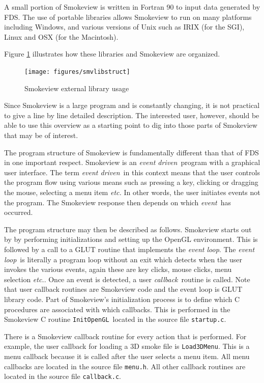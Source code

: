 \documentclass[11pt,twoside]{book}
\begin{document}
A small portion of Smokeview is written in Fortran 90 to input
data generated by FDS.  The use of portable libraries allows
Smokeview to run on many platforms including Windows, and various
versions of Unix such as IRIX (for the SGI), Linux and OSX (for
the Macintosh).

Figure \ref{smvlibstruct} illustrates how these libraries and
Smokeview are organized.

\begin{figure}
\texttt{[image: figures/smvlibstruct]}
\caption{Smokeview external library usage}
\label{smvlibstruct}
\end{figure}


Since Smokeview is a large program and is constantly changing, it
is not practical to give a line by line detailed description. The
interested user, however, should be able to use this overview as a
starting point to dig into those parts of Smokeview that may be of
interest.

The program structure of Smokeview is fundamentally different than
that of FDS in one important respect.  Smokeview is an {\em event
driven}\ program with a graphical user interface.  The term {\em
event driven}\ in this context means that the user controls the
program flow using various means such as pressing a key, clicking
or dragging the mouse, selecting a menu item {\em etc.}  In other
words, the user initiates events not the program. The Smokeview
response then depends on which {\em event}\ has occurred.

The program structure may then be described as follows. Smokeview
starts out by by performing initializations and setting up the
OpenGL environment. This is followed by a call to a GLUT routine
that implements the {\em event loop}. The {\em event loop}\ is
literally a program loop without an exit which detects when the
user invokes the various events, again these are key clicks, mouse
clicks, menu selection {\em etc.}. Once an event is detected, a
user {\em callback}\ routine is called.  Note that user callback
routines are Smokeview code and the event loop is GLUT library
code. Part of Smokeview's initialization process is to define
which C procedures are associated with which callbacks.  This is
performed in the Smokeview C routine {\tt InitOpenGL}\ located in
the source file {\tt startup.c}.

There is a Smokeview callback routine for every action that is
performed.  For example, the user callback for loading a 3D smoke
file is {\tt Load3DMenu}.  This is a menu callback because it is
called after the user selects a menu item.  All menu callbacks are
located in the source file {\tt menu.h}.  All other callback
routines are located in the source file {\tt callback.c}.
\end{document}
